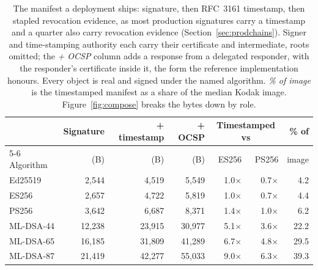 \begin{table}[t]
\caption{The manifest a deployment ships: signature, then RFC~3161 timestamp, then stapled revocation evidence, as most production signatures carry a timestamp and a quarter also carry revocation evidence (Section~\ref{sec:prodchains}). Signer and time-stamping authority each carry their certificate and intermediate, roots omitted; the \emph{+ OCSP} column adds a response from a delegated responder, with the responder's certificate inside it, the form the reference implementation honours. Every object is real and signed under the named algorithm. \emph{\% of image} is the timestamped manifest as a share of the median Kodak image. Figure~\ref{fig:compose} breaks the bytes down by role.}
\label{tab:timestamp}
\small
\setlength{\tabcolsep}{4pt}
\begin{tabular}{lrrrrrr}
\toprule
 & Signature & + timestamp & + OCSP & \multicolumn{2}{c}{Timestamped vs} & \% of\\
\cmidrule(lr){5-6}
Algorithm & (B) & (B) & (B) & ES256 & PS256 & image\\
\midrule
Ed25519 & 2,544 & 4,519 & 5,549 & 1.0$\times$ & 0.7$\times$ & 4.2\\
ES256 & 2,657 & 4,722 & 5,819 & 1.0$\times$ & 0.7$\times$ & 4.4\\
PS256 & 3,642 & 6,687 & 8,371 & 1.4$\times$ & 1.0$\times$ & 6.2\\
ML-DSA-44 & 12,238 & 23,915 & 30,977 & 5.1$\times$ & 3.6$\times$ & 22.2\\
ML-DSA-65 & 16,185 & 31,809 & 41,289 & 6.7$\times$ & 4.8$\times$ & 29.5\\
ML-DSA-87 & 21,419 & 42,277 & 55,033 & 9.0$\times$ & 6.3$\times$ & 39.3\\
\bottomrule
\end{tabular}
\end{table}
